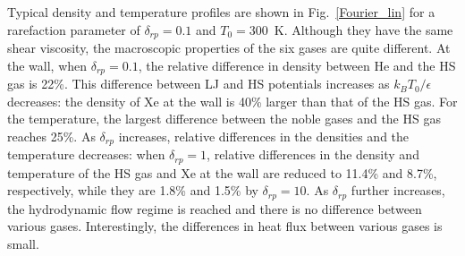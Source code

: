 

Typical density and temperature profiles are shown in Fig.~\ref{Fourier_lin} for a rarefaction parameter of $\delta_{rp}=0.1$ and $T_0=300$~K. Although they have the same shear viscosity, the macroscopic properties of the six gases are quite different.  At the wall, when $\delta_{rp}=0.1$, the relative difference in  density between He and the HS gas is 22\%. This difference between LJ and HS potentials increases as $k_BT_0/\epsilon$ decreases: the density of Xe at the wall is 40\% larger than that of the HS gas. For the temperature, the largest difference between the noble gases and the HS gas reaches 25\%. As $\delta_{rp}$ increases, relative differences in the densities and the temperature decreases: when $\delta_{rp}=1$, relative differences in the density and temperature of the HS gas and Xe at the wall are reduced to 11.4\% and 8.7\%, respectively, while they are 1.8\% and 1.5\% by $\delta_{rp}=10$. As $\delta_{rp}$  further increases, the hydrodynamic flow regime is reached and there is no difference between various gases. Interestingly, the differences in heat flux between various gases is small.



%
%
%
%

